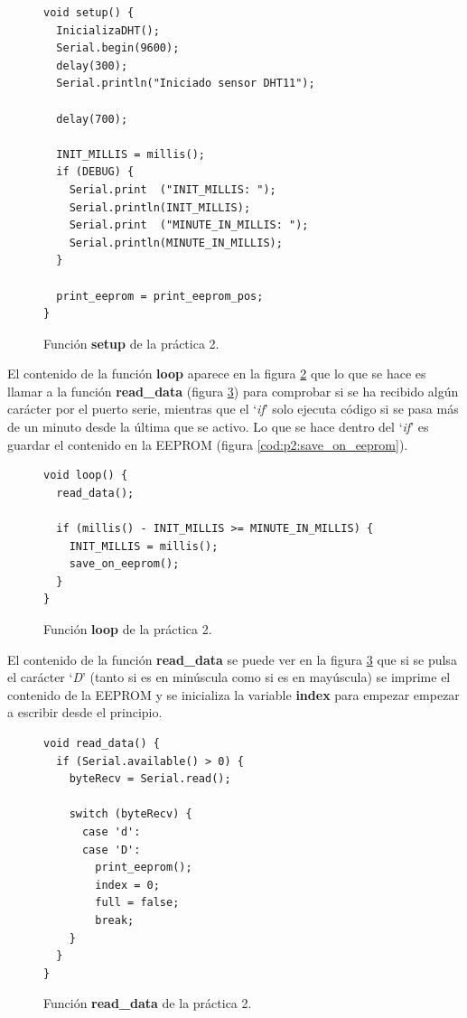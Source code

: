 \documentclass{article}
\begin{document}
\begin{figure}[h]
	\begin{lstlisting}[style=C]
void setup() {
  InicializaDHT();
  Serial.begin(9600); 
  delay(300);
  Serial.println("Iniciado sensor DHT11");

  delay(700);
  
  INIT_MILLIS = millis();
  if (DEBUG) {
    Serial.print  ("INIT_MILLIS: ");
    Serial.println(INIT_MILLIS);
    Serial.print  ("MINUTE_IN_MILLIS: ");
    Serial.println(MINUTE_IN_MILLIS);
  }
  
  print_eeprom = print_eeprom_pos;
}
	\end{lstlisting}
	\caption{Función \textbf{setup} de la práctica 2.}
	\label{cod:p2:setup}
\end{figure}

	El contenido de la función \textbf{loop} aparece en la figura \ref{cod:p2:loop} que lo que se hace es llamar a la función \textbf{read\_data} (figura \ref{cod:p2:read_data}) para comprobar si se ha recibido algún carácter por el puerto serie, mientras que el `\textit{if}' solo ejecuta código si se pasa más de un minuto desde la última que se activo. Lo que se hace dentro del `\textit{if}' es guardar el contenido en la EEPROM (figura \ref{cod:p2:save_on_eeprom}).

\begin{figure}[h]
	\begin{lstlisting}[style=c]
void loop() {  
  read_data();
  
  if (millis() - INIT_MILLIS >= MINUTE_IN_MILLIS) {
    INIT_MILLIS = millis();
    save_on_eeprom();
  }
}
	\end{lstlisting}
	\caption{Función \textbf{loop} de la práctica 2.}
	\label{cod:p2:loop}
\end{figure}

	El contenido de la función \textbf{read\_data} se puede ver en la figura \ref{cod:p2:read_data} que si se pulsa el carácter `\textit{D}' (tanto si es en minúscula como si es en mayúscula) se imprime el contenido de la EEPROM y se inicializa la variable \textbf{index} para empezar empezar a escribir desde el principio.

\begin{figure}[h]
	\begin{lstlisting}[style=c]
void read_data() {
  if (Serial.available() > 0) {
    byteRecv = Serial.read();
    
    switch (byteRecv) {
      case 'd':
      case 'D':
        print_eeprom();        
        index = 0;
        full = false;        
        break;
    }
  }
}
	\end{lstlisting}
	\caption{Función \textbf{read\_data} de la práctica 2.}
	\label{cod:p2:read_data}
\end{figure}
\end{document}
